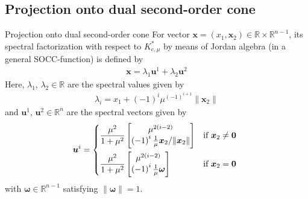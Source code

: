 \documentclass[8pt,red]{beamer}
\theoremstyle{plain}
\theoremstyle{definition}
\theoremstyle{remark}
\renewcommand{\Re}{\ensuremath{\mathbb{R}}}
\newcommand{\bi}[1]{\ensuremath{\boldsymbol{#1}}}
\begin{document}
\subsection{Projection onto dual second-order cone}
\begin{frame}{Projection onto dual second-order cone}
For vector $\bi{x} = (x_{1},\bi{x}_{2}) \in \Re \times \Re^{n-1}$, its spectral 
factorization with respect to $K_{e,\mu}^{*}$ by means of Jordan algebra (in a general SOCC-function) is defined by \citep{hayashi2005combined}
\begin{align}
  \bi{x} = \lambda_{1} \bi{u}^{1} + \lambda_{2} \bi{u}^{2}  
\end{align}
Here, $\lambda_{1}$, $\lambda_{2} \in \Re$ are the spectral values given by 
\begin{align}
  \lambda_{i} = x_{1} + \left({-}1\right)^{i} \mu^{\left({-}1\right)^{i+1}} \| \bi{x}_{2} \|  
\end{align}
and $\bi{u}^{1}$, $\bi{u}^{2}  \in \Re^{n}$ are the spectral vectors 
given by 
\begin{align}
  \bi{u}^{i} = 
  \begin{dcases*}
    \frac{\mu^{2}}{1+\mu^{2}}
    \begin{bmatrix}
      \mu^{2 \left(i-2\right)}  \\   \left({-}1\right)^{i} \frac{1}{\mu} \bi{x}_{2} / \| \bi{x}_{2} \| 
    \end{bmatrix}
    & if $\bi{x}_{2} \not= \bi{0}$ \\
    \frac{\mu^{2}}{1+\mu^{2}}
    \begin{bmatrix}
      \mu^{2 \left(i-2\right)}  \\   \left({-}1\right)^{i} \frac{1}{\mu} \bi{\omega}
    \end{bmatrix}
    & if $\bi{x}_{2} = \bi{0}$ \\
  \end{dcases*}  
\end{align}
with $\bi{\omega} \in \Re^{n-1}$ satisfying $\| \bi{\omega} \| = 1$.
\end{frame}
\end{document}
